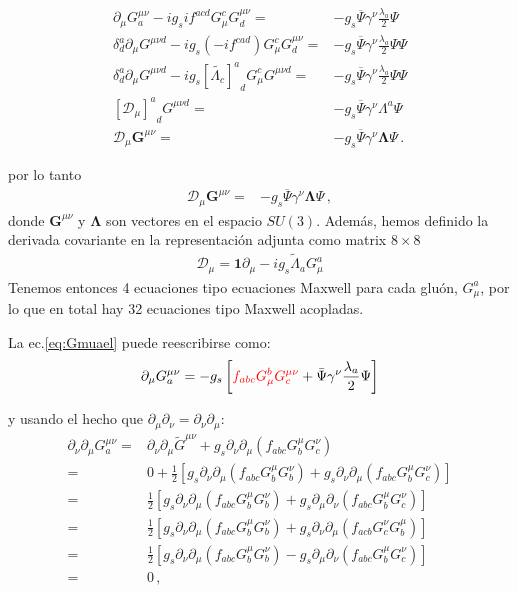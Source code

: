 \begin{align}
\label{eq:Gmuael}
\partial_\mu{G}^{\mu\nu}_a-i g_s i f^{acd}G^c_\mu{G}^{\mu\nu}_d
=&-g_s\overline{\Psi}\gamma^\nu\frac{\lambda_a}{2}\Psi\nonumber\\
\delta^a_d\partial_\mu{G}^{\mu\nu d}-i g_s \left(-i f^{cad}\right)G^c_\mu{G}^{\mu\nu}_d
=&-g_s\overline{\Psi}\gamma^\nu\frac{\lambda_a}{2}\Psi\Psi\nonumber\\
\delta^a_d\partial_\mu{G}^{\mu\nu d}-i g_s {\left[\widetilde{\Lambda_c}\right]^a}_d G^c_\mu{G}^{\mu\nu d}
=&-g_s\overline{\Psi}\gamma^\nu\frac{\lambda_a}{2}\Psi\Psi\nonumber\\
{\left[ \mathcal{D}_\mu \right]^a}_d{G}^{\mu\nu d}
=&-g_s\overline{\Psi}\gamma^\nu\Lambda^{a}\Psi \nonumber\\
  \mathcal{D}_\mu{\boldsymbol{G}}^{\mu\nu}
=&-g_s\overline{\Psi}\gamma^\nu\boldsymbol{\Lambda}\Psi\,.
\end{align}
\begin{frame}
por lo tanto
\begin{align}
  \mathcal{D}_\mu{\boldsymbol{G}}^{\mu\nu}
=&-g_s\overline{\Psi}\gamma^\nu\boldsymbol{\Lambda}\Psi\,,
\end{align}
donde $\boldsymbol{G}^{\mu\nu}$ y $\boldsymbol{\Lambda}$ son vectores en el espacio $SU(3)$. 
Además, hemos definido la derivada covariante en la representación adjunta como matrix  $8\times8$ 
\begin{align}
  \mathcal{D}_{\mu}=\mathbf{1}\partial_{\mu}-i g_s \widetilde{\Lambda}_a G_{\mu}^{a} 
\end{align}
Tenemos entonces 4 ecuaciones tipo ecuaciones Maxwell para cada gluón, $G_{\mu}^{a}$, por lo que en total
hay 32 ecuaciones tipo Maxwell acopladas.

La ec.\eqref{eq:Gmuael} puede reescribirse como:
\begin{align}
  \partial_\mu G^{\mu\nu}_a=-g_s\left[{\color{red}f_{abc}G^b_\mu G^{\mu\nu}_c}+\bar{\Psi}\gamma^\nu\frac{\lambda_a}{2}\Psi  \right]
\end{align}
\end{frame}
y usando el hecho que $\partial_\mu\partial_\nu=\partial_\nu\partial_\mu$:
\begin{align}
  \partial_\nu\partial_\mu G^{\mu\nu}_a=&\partial_\nu\partial_\mu\widetilde{G}^{\mu\nu}+g_s\partial_\nu\partial_\mu\left(f_{abc}G^\mu_bG^\nu_c\right)\nonumber\\
=&0+\frac{1}{2}\left[g_s\partial_\nu\partial_\mu\left(f_{abc}G^\mu_bG^\nu_b\right)+g_s\partial_\nu\partial_\mu\left(f_{abc}G^\mu_bG^\nu_c\right)\right]\nonumber\\
=&\frac{1}{2}\left[g_s\partial_\nu\partial_\mu\left(f_{abc}G^\mu_bG^\nu_b\right)+g_s\partial_\mu\partial_\nu\left(f_{abc}G^\mu_bG^\nu_c\right)\right]\nonumber\\
=&\frac{1}{2}\left[g_s\partial_\nu\partial_\mu\left(f_{abc}G^\mu_bG^\nu_b\right)+g_s\partial_\nu\partial_\mu\left(f_{acb}G^\nu_cG^\mu_b\right)\right]\nonumber\\
=&\frac{1}{2}\left[g_s\partial_\nu\partial_\mu\left(f_{abc}G^\mu_bG^\nu_b\right)-g_s\partial_\mu\partial_\nu\left(f_{abc}G^\mu_bG^\nu_c\right)\right]\nonumber\\
=&0\,,
\end{align}
